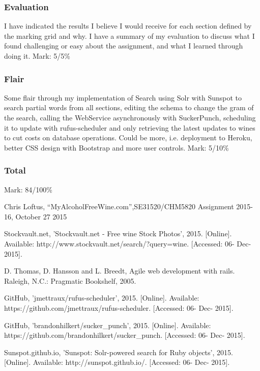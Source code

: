\documentclass[12pt]{article}
\begin{document}
\subsubsection{Evaluation}
I have indicated the results I believe I would receive for each section defined by the marking grid and why. I have a summary of my evaluation to discuss what I found challenging or easy about the assignment, and what I learned through doing it.
\newline
Mark: 5/5\%

\subsubsection{Flair}
Some flair through my implementation of Search using Solr with Sunspot to search partial words from all sections, editing the schema to change the gram of the search, calling the WebService asynchronously with SuckerPunch, scheduling it to update with rufus-scheduler and only retrieving the latest updates to wines to cut costs on database operations. Could be more, i.e. deployment to Heroku, better CSS design with Bootstrap and more user controls.
\newline
Mark: 5/10\%

\subsubsection{Total}
Mark: 84/100\%



\clearpage


\begin{thebibliography}{5}

 Chris Loftus, ``MyAlcoholFreeWine.com'',SE31520/CHM5820 Assignment 2015-16, October 27 2015

 Stockvault.net, 'Stockvault.net - Free wine Stock Photos', 2015. [Online]. Available: http://www.stockvault.net/search/?query=wine. [Accessed: 06- Dec- 2015].

 D. Thomas, D. Hansson and L. Breedt, Agile web development with rails. Raleigh, N.C.: Pragmatic Bookshelf, 2005.

 GitHub, 'jmettraux/rufus-scheduler', 2015. [Online]. Available: https://github.com/jmettraux/rufus-scheduler. [Accessed: 06- Dec- 2015].

 GitHub, 'brandonhilkert/sucker\_punch', 2015. [Online]. Available: https://github.com/brandonhilkert/sucker\_punch. [Accessed: 06- Dec- 2015].

  Sunspot.github.io, 'Sunspot: Solr-powered search for Ruby objects', 2015. [Online]. Available: http://sunspot.github.io/. [Accessed: 06- Dec- 2015].

\end{thebibliography}
\end{document}
